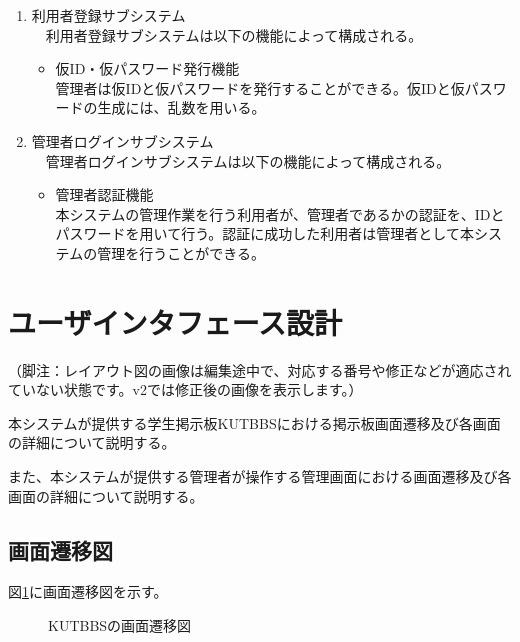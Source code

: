\documentclass[a4j]{jarticle}
\begin{document}
\begin{enumerate}
  \item 利用者登録サブシステム\\
  　利用者登録サブシステムは以下の機能によって構成される。
  \begin{itemize}
    \item 仮ID・仮パスワード発行機能\\
    管理者は仮IDと仮パスワードを発行することができる。仮IDと仮パスワードの生成には、乱数を用いる。\\
  \end{itemize}


  \item 管理者ログインサブシステム\\
  　管理者ログインサブシステムは以下の機能によって構成される。
  \begin{itemize}
    \item 管理者認証機能\\
    本システムの管理作業を行う利用者が、管理者であるかの認証を、IDとパスワードを用いて行う。認証に成功した利用者は管理者として本システムの管理を行うことができる。
  \end{itemize}

\end{enumerate}



\section{ユーザインタフェース設計}
（脚注：レイアウト図の画像は編集途中で、対応する番号や修正などが適応されていない状態です。v2では修正後の画像を表示します。）

本システムが提供する学生掲示板KUTBBSにおける掲示板画面遷移及び各画面の詳細について説明する。

また、本システムが提供する管理者が操作する管理画面における画面遷移及び各画面の詳細について説明する。

\subsection{画面遷移図}
図\ref{fig:Screen_transition}に画面遷移図を示す。
\begin{figure}[H]
\centering
{}
\caption{KUTBBSの画面遷移図}
\label{fig:Screen_transition}
\end{figure}
\end{document}
